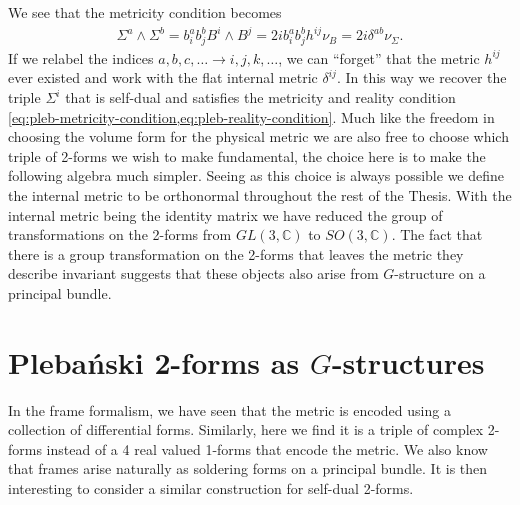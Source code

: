\documentclass[10pt]{report}
\newcommand{\pleb}[0]{Pleba\'nski}
\theoremstyle{definition}
\newcommand{\C}[0]{\mathbb{C}}
\begin{document}
We see that the metricity condition becomes 
\begin{align}
    \Sigma^a \wedge \Sigma^b = b^a_i b^b_j B^i \wedge B^j = 2i b^a_i b^b_j h^{ij} \nu_B = 2i \delta^{ab} \nu_\Sigma.
\end{align} 
If we relabel the indices $a,b,c,\ldots \rightarrow i,j,k,\ldots$, we can ``forget'' that the metric $h^{ij}$ ever existed and work with the flat internal metric $\delta^{ij}$. In this way we recover the triple $\Sigma^i$ that is self-dual and satisfies the metricity and reality condition \cref{eq:pleb-metricity-condition,eq:pleb-reality-condition}. Much like the freedom in choosing the volume form for the physical metric we are also free to choose which triple of 2-forms we wish to make fundamental, the choice here is to make the following algebra much simpler. Seeing as this choice is always possible we define the internal metric to be orthonormal throughout the rest of the Thesis. With the internal metric being the identity matrix we have reduced the group of transformations on the 2-forms from $GL(3,\C)$ to $SO(3,\C)$. The fact that there is a group transformation on the 2-forms that leaves the metric they describe invariant suggests that these objects also arise from $G$-structure on a principal bundle.

\section{\pleb{} 2-forms as \texorpdfstring{$G$}{G}-structures}
In the frame formalism, we have seen that the metric is encoded using a collection of differential forms. Similarly, here we find it is a triple of complex 2-forms instead of a 4 real valued 1-forms that encode the metric. We also know that frames arise naturally as soldering forms on a principal bundle. It is then interesting to consider a similar construction for self-dual 2-forms.
\end{document}
